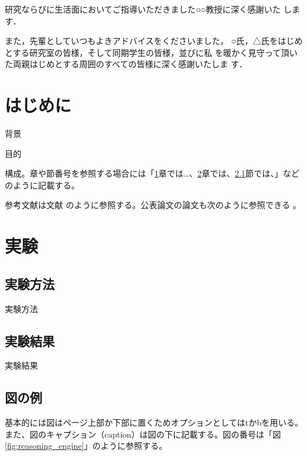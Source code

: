 \documentclass[a4paper, 12pt]{ltjreport}
\begin{document}
研究ならびに生活面においてご指導いただきました○○教授に深く感謝いた
します．

また，先輩としていつもよきアドバイスをくださいました，
○氏，△氏をはじめとする研究室の皆様，そして同期学生の皆様，並びに私
を暖かく見守って頂いた両親はじめとする周囲のすべての皆様に深く感謝いたしま
す．

\tableofcontents %
\listoffigures %
\listoftables %


\chapter{はじめに} \label{chap:intro}
\setcounter{page}{1}   %

 背景

 目的

 構成。章や節番号を参照する場合には「\ref{chap:intro}章では…、\ref{chap:exp}章では、\ref{sec:method}節では、」などのように記載する。
 
参考文献は文献 \cite{Goto00} のように参照する。公表論文の論文も次のように参照できる \cite{publication1}。

\chapter{実験} \label{chap:exp}
 \section{実験方法} \label{sec:method}
 実験方法

 \section{実験結果}
 実験結果

 
 \section{図の例}

 基本的には図はページ上部か下部に置くためオプションとしてはtかbを用いる。また、図のキャプション（caption）は図の下に記載する。図の番号は「図\ref{fig:reasoning_engine}」のように参照する。
 
\end{document}
